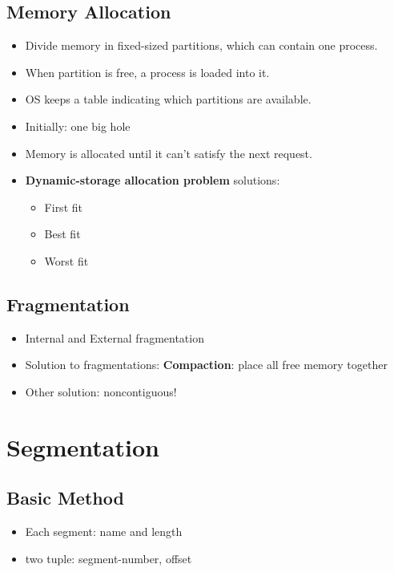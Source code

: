 \documentclass[10pt]{report}
\begin{document}
		\subsection{Memory Allocation}
			\begin{itemize}
				\item Divide memory in fixed-sized partitions, which can contain one process.
				\item When partition is free, a process is loaded into it.
				\item OS keeps a table indicating which partitions are available.
				\item Initially: one big hole
				\item Memory is allocated until it can't satisfy the next request.
				\item \textbf{Dynamic-storage allocation problem} solutions:
				\begin{itemize}
					\item First fit
					\item Best fit
					\item Worst fit
				\end{itemize}
			\end{itemize}

		\subsection{Fragmentation}
			\begin{itemize}
				\item Internal and External fragmentation
				\item Solution to fragmentations: \textbf{Compaction}: place all free memory together
				\item Other solution: noncontiguous!
			\end{itemize}

	\section{Segmentation}
		\subsection{Basic Method}
			\begin{itemize}
				\item Each segment: name and length
				\item two tuple: segment-number, offset
			\end{itemize}
\end{document}
